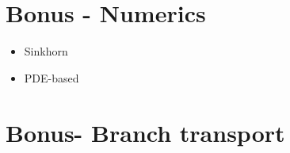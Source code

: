 \documentclass{article}
\begin{document}
\section{Bonus - Numerics}
\begin{itemize}
\item Sinkhorn
\item PDE-based
\end{itemize}

\section{Bonus- Branch transport}


\end{document}
